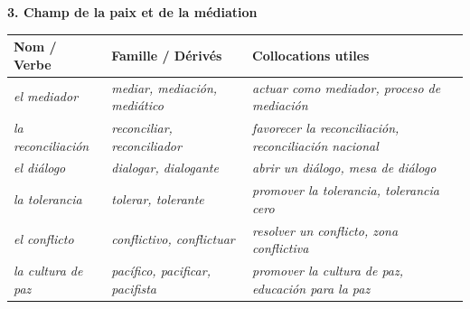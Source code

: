 \documentclass[11pt]{article}
\newcommand{\esp}[1]{\ifmmode\text{\textit{#1}}\else\begingroup\selectlanguage{spanish}\itshape #1\endgroup\fi}
\begin{document}
\begin{propriete}
\textbf{3. Champ de la paix et de la médiation}\par
\begin{center}
\begin{tabularx}{\linewidth}{|X|X|X|}\hline
\rowcolor{popgreenL} \textbf{Nom / Verbe} & \textbf{Famille / Dérivés} & \textbf{Collocations utiles} \\ \hline
\esp{el mediador} & \esp{mediar, mediación, mediático} & \esp{actuar como mediador, proceso de mediación} \\ \hline
\esp{la reconciliación} & \esp{reconciliar, reconciliador} & \esp{favorecer la reconciliación, reconciliación nacional} \\ \hline
\esp{el diálogo} & \esp{dialogar, dialogante} & \esp{abrir un diálogo, mesa de diálogo} \\ \hline
\esp{la tolerancia} & \esp{tolerar, tolerante} & \esp{promover la tolerancia, tolerancia cero} \\ \hline
\esp{el conflicto} & \esp{conflictivo, conflictuar} & \esp{resolver un conflicto, zona conflictiva} \\ \hline
\esp{la cultura de paz} & \esp{pacífico, pacificar, pacifista} & \esp{promover la cultura de paz, educación para la paz} \\ \hline
\end{tabularx}
\end{center}
\end{propriete}
\end{document}

